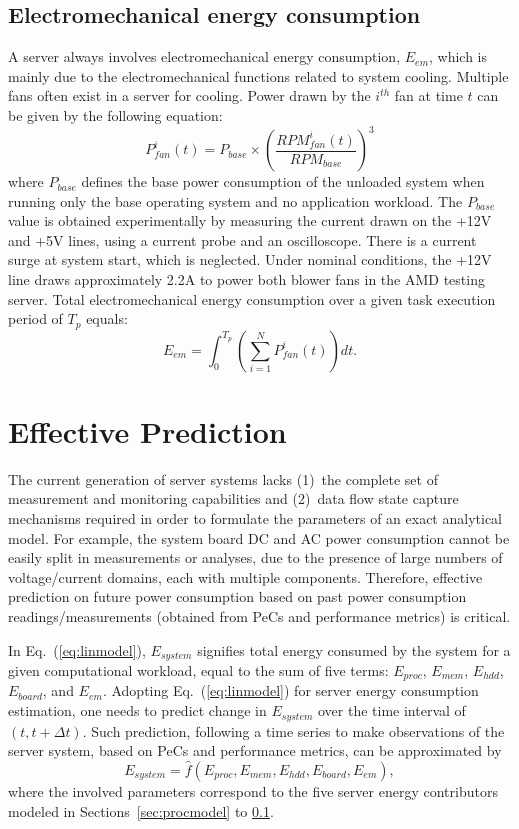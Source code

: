 \documentclass[acmtaco]{acmtrans2m}
\newcommand{\equationname}{Eq.}
\begin{document}
\subsection{Electromechanical energy consumption}
\label{sec:electrical}
A server always involves electromechanical energy consumption, $E_{em}$,
which is mainly due to the electromechanical functions related to system
cooling.  Multiple fans often exist in a server for cooling.  Power
drawn by the $i^{th}$ fan at time $t$ can be given by the following
equation:
\begin{equation}
\label{eq:fanp}
P_{fan}^{i}(t) = P_{base} \times \left(\frac{RPM_{fan}^{i}(t)}{RPM_{base}}\right)^3
\end{equation} 
where $P_{base}$ defines the base power consumption of the unloaded system
when running only the base operating system and no application workload.
The $P_{base}$ value is obtained experimentally by measuring the current drawn
on the +12V and +5V lines, using a current probe and an oscilloscope.
There is a current surge at system start, which is neglected.
Under nominal conditions, the +12V line draws approximately 2.2A
to power both blower fans in the AMD testing server. Total electromechanical energy consumption over a given task execution
period of $T_{p}$ equals:
\begin{equation*}
\label{eq:elect}
E_{em} =  \int^{T_{p}}_0 \left(\sum_{i=1}^NP_{fan}^{i}(t)\right)dt.
\end{equation*} 
\section{Effective Prediction}
\label{sec:application}
The current generation of server systems lacks (1)~the complete set of
measurement and monitoring capabilities and (2)~data flow state capture
mechanisms required in order to formulate the parameters of an exact
analytical model.  For example, the system board DC and AC power
consumption cannot be easily split in measurements or analyses, due to
the presence of large numbers of voltage/current domains, each with
multiple components.  Therefore, effective prediction on future power
consumption based on past power consumption readings/measurements
(obtained from PeCs and performance metrics) is critical.

In \equationname~(\ref{eq:linmodel}), $E_{system }$ signifies total
energy consumed by the system for a given computational workload, equal
to the sum of five terms: $E_{proc}$, $E_{mem}$, $E_{hdd}$, $E_{board}$,
and $E_{em}$.  Adopting \equationname~(\ref{eq:linmodel}) for server
energy consumption estimation, one needs to predict change in
$E_{system}$ over the time interval of $(t, t+\Delta t)$.  Such
prediction, following a time series to make observations of the server
system, based on PeCs and performance metrics, can be approximated by
\begin{equation}
\label{eq:tseries}
E_{system} = \hat{f}(E_{proc}, E_{mem}, E_{hdd}, E_{board}, E_{em}),
\end{equation}
where the involved parameters correspond to the five server energy
contributors modeled in Sections~\ref{sec:procmodel} to \ref{sec:electrical}.
\end{document}
